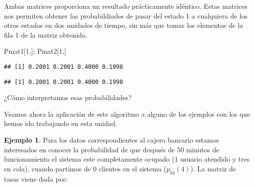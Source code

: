 \documentclass[
]{book}
\newenvironment{Shaded}{\begin{snugshade}}{\end{snugshade}}
\newcommand{\DecValTok}[1]{\textcolor[rgb]{0.00,0.00,0.81}{#1}}
\newcommand{\NormalTok}[1]{#1}
\theoremstyle{definition}
\theoremstyle{definition}
\newtheorem{example}{Ejemplo}[chapter]
\theoremstyle{definition}
\theoremstyle{definition}
\theoremstyle{remark}
\begin{document}
Ambas matrices proporciona un resultado prácticamente idéntico. Estas matrices nos permiten obtener las probabildiades de pasar del estado 1 a cualquiera de los otros estados en dos unidades de tiempo, sin más que tomar los elementos de la fila 1 de la matriz obtenida.

\begin{Shaded}
\begin{Highlighting}[]
\NormalTok{Pmat1[}\DecValTok{1}\NormalTok{,]; Pmat2[}\DecValTok{1}\NormalTok{,]}
\end{Highlighting}
\end{Shaded}

\begin{verbatim}
## [1] 0.2001 0.2001 0.4000 0.1998
\end{verbatim}

\begin{verbatim}
## [1] 0.2001 0.2001 0.4000 0.1998
\end{verbatim}

¿Cómo interpretamos esas probabilidades?

Veamos ahora la aplicación de este algoritmo a alguno de los ejemplos con los que hemos ido trabajando en esta unidad.

\begin{example}
Para los datos correspondientes al cajero bancario estamos interesados en conocer la probabilidad de que después de 50 minutos de funcionamiento el sistema este completamente ocupado (1 usuario atendido y tres en cola), cuando partímos de \(0\) clientes en el sistema (\(p_{04}(4)\)). La matriz de tasas viene dada por:
\end{example}
\end{document}
